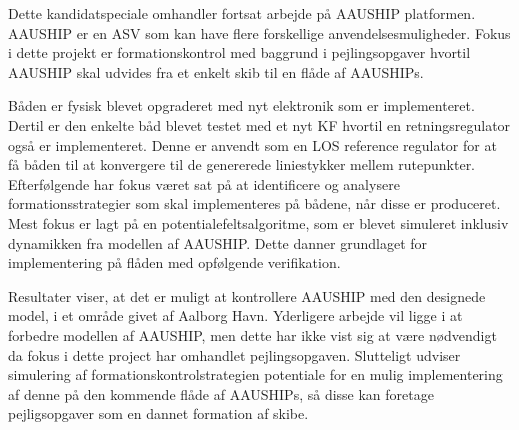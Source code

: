 Dette kandidatspeciale omhandler fortsat arbejde på AAUSHIP platformen. AAUSHIP er en \ac{ASV} som kan have flere forskellige anvendelsesmuligheder. Fokus i dette projekt er formationskontrol med baggrund i pejlingsopgaver hvortil AAUSHIP skal udvides fra et enkelt skib til en flåde af AAUSHIPs.

Båden er fysisk blevet opgraderet med nyt elektronik som er implementeret. Dertil er den enkelte båd blevet testet med et nyt \ac{KF} hvortil en retningsregulator også er implementeret. Denne er anvendt som en \ac{LOS} reference regulator for at få båden til at konvergere til de genererede liniestykker mellem rutepunkter. Efterfølgende har fokus været sat på at identificere og analysere formationsstrategier som skal implementeres på bådene, når disse er produceret. Mest fokus er lagt på en potentialefeltsalgoritme, som er blevet simuleret inklusiv dynamikken fra modellen af AAUSHIP. Dette danner grundlaget for implementering på flåden med opfølgende verifikation.

Resultater viser, at det er muligt at kontrollere AAUSHIP med den designede model, i et område givet af Aalborg Havn. Yderligere arbejde vil ligge i at forbedre modellen af AAUSHIP, men dette har ikke vist sig at være nødvendigt da fokus i dette project har omhandlet pejlingsopgaven. Slutteligt udviser simulering af formationskontrolstrategien potentiale for en mulig implementering af denne på den kommende flåde af AAUSHIPs, så disse kan foretage pejligsopgaver som en dannet formation af skibe.